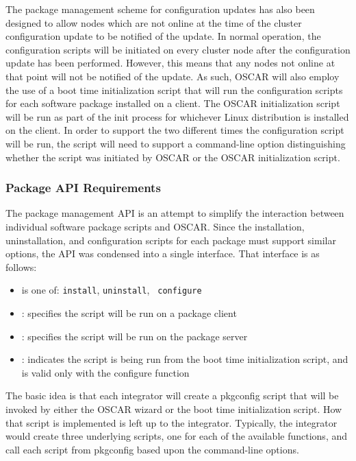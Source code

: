 The package management scheme for configuration updates has also been
designed to allow nodes which are not online at the time of the
cluster configuration update to be notified of the update. In normal
operation, the configuration scripts will be initiated on every
cluster node after the configuration update has been
performed. However, this means that any nodes not online at that point
will not be notified of the update. As such, OSCAR will also employ
the use of a boot time initialization script that will run the
configuration scripts for each software package installed on a
client. The OSCAR initialization script will be run as part of the
init process for whichever Linux distribution is installed on the
client. In order to support the two different times the configuration
script will be run, the script will need to support a command-line
option distinguishing whether the script was initiated by OSCAR or the
OSCAR initialization script.

\subsubsection{Package API Requirements}

The package management API is an attempt to simplify the interaction
between individual software package scripts and OSCAR.  Since the
installation, uninstallation, and configuration scripts for each
package must support similar options, the API was condensed into a
single interface. That interface is as follows:


\begin{itemize}
\item {} is one of: {\tt install}, {\tt uninstall}, {\tt
configure}

\item {}: specifies the script will be run on a package client

\item {}: specifies the script will be run on the package server

\item {}: indicates the script is being run from the boot
time initialization script, and is valid only with the configure
function
\end{itemize}

The basic idea is that each integrator will create a pkgconfig script
that will be invoked by either the OSCAR wizard or the boot time
initialization script. How that script is implemented is left up to
the integrator. Typically, the integrator would create three
underlying scripts, one for each of the available functions, and call
each script from pkgconfig based upon the command-line options.


